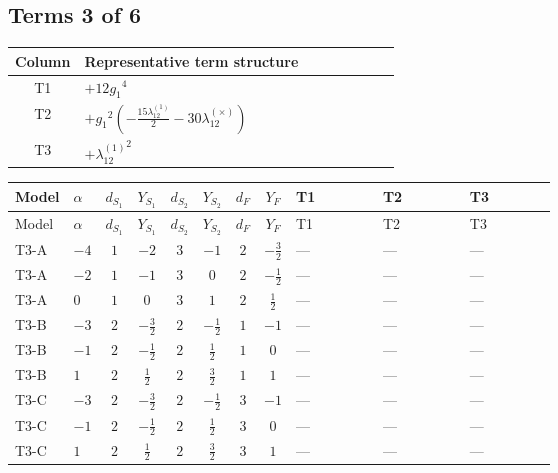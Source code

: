 \documentclass[8pt]{article}
\begin{document}
\begin{landscape}
\subsection*{Terms 3 of 6}
\begin{center}
\begin{tabular}{@{}c >{\raggedright\arraybackslash}p{0.82\linewidth}@{}}
\toprule
Column & Representative term structure \\
\midrule
T1 & \(\displaystyle +12 {g_1}^4\) \\
\midrule
T2 & \(\displaystyle +{g_1}^2 \left(-\frac{15 {\lambda_{12}^{(1)}}}{2}-30 {\lambda_{12}^{(\times)}}\right)\) \\
\midrule
T3 & \(\displaystyle +{\lambda_{12}^{(1)}}^2\) \\
\midrule
\bottomrule
\end{tabular}
\end{center}
\smallskip
\tiny
\begin{longtable}{@{}llcccccc >{\raggedright\arraybackslash}p{0.21\linewidth} >{\raggedright\arraybackslash}p{0.21\linewidth} >{\raggedright\arraybackslash}p{0.21\linewidth}@{}}
\toprule
Model & $\alpha$ & $d_{S_1}$ & $Y_{S_1}$ & $d_{S_2}$ & $Y_{S_2}$ & $d_F$ & $Y_F$ & T1 & T2 & T3 \\
\midrule
\endfirsthead
\toprule
Model & $\alpha$ & $d_{S_1}$ & $Y_{S_1}$ & $d_{S_2}$ & $Y_{S_2}$ & $d_F$ & $Y_F$ & T1 & T2 & T3 \\
\midrule
\endhead
T3-A & $-4$ & $1$ & $-2$ & $3$ & $-1$ & $2$ & $-\frac{3}{2}$ & --- & --- & --- \\
\midrule
T3-A & $-2$ & $1$ & $-1$ & $3$ & $0$ & $2$ & $-\frac{1}{2}$ & --- & --- & --- \\
\midrule
T3-A & $0$ & $1$ & $0$ & $3$ & $1$ & $2$ & $\frac{1}{2}$ & --- & --- & --- \\
\midrule
T3-B & $-3$ & $2$ & $-\frac{3}{2}$ & $2$ & $-\frac{1}{2}$ & $1$ & $-1$ & --- & --- & --- \\
\midrule
T3-B & $-1$ & $2$ & $-\frac{1}{2}$ & $2$ & $\frac{1}{2}$ & $1$ & $0$ & --- & --- & --- \\
\midrule
T3-B & $1$ & $2$ & $\frac{1}{2}$ & $2$ & $\frac{3}{2}$ & $1$ & $1$ & --- & --- & --- \\
\midrule
T3-C & $-3$ & $2$ & $-\frac{3}{2}$ & $2$ & $-\frac{1}{2}$ & $3$ & $-1$ & --- & --- & --- \\
\midrule
T3-C & $-1$ & $2$ & $-\frac{1}{2}$ & $2$ & $\frac{1}{2}$ & $3$ & $0$ & --- & --- & --- \\
\midrule
T3-C & $1$ & $2$ & $\frac{1}{2}$ & $2$ & $\frac{3}{2}$ & $3$ & $1$ & --- & --- & --- \\

\end{longtable}
\end{landscape}
\end{document}
